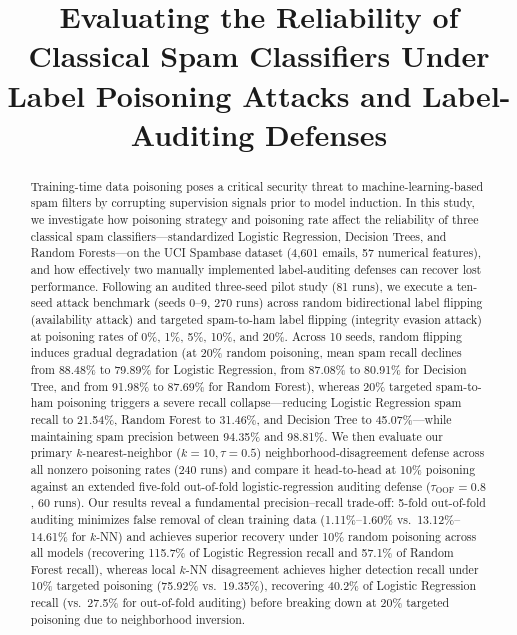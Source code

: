 \documentclass[10pt,conference]{IEEEtran}
\begin{document}
\title{Evaluating the Reliability of Classical Spam Classifiers Under Label Poisoning Attacks and Label-Auditing Defenses}

\author{
}

\maketitle

\begin{abstract}
Training-time data poisoning poses a critical security threat to machine-learning-based spam filters by corrupting supervision signals prior to model induction. In this study, we investigate how poisoning strategy and poisoning rate affect the reliability of three classical spam classifiers---standardized Logistic Regression, Decision Trees, and Random Forests---on the UCI Spambase dataset (4,601 emails, 57 numerical features), and how effectively two manually implemented label-auditing defenses can recover lost performance. Following an audited three-seed pilot study (81 runs), we execute a ten-seed attack benchmark (seeds 0--9, 270 runs) across random bidirectional label flipping (availability attack) and targeted spam-to-ham label flipping (integrity evasion attack) at poisoning rates of 0\%, 1\%, 5\%, 10\%, and 20\%. Across 10 seeds, random flipping induces gradual degradation (at 20\% random poisoning, mean spam recall declines from 88.48\% to 79.89\% for Logistic Regression, from 87.08\% to 80.91\% for Decision Tree, and from 91.98\% to 87.69\% for Random Forest), whereas 20\% targeted spam-to-ham poisoning triggers a severe recall collapse---reducing Logistic Regression spam recall to 21.54\%, Random Forest to 31.46\%, and Decision Tree to 45.07\%---while maintaining spam precision between 94.35\% and 98.81\%. We then evaluate our primary $k$-nearest-neighbor ($k=10, \tau=0.5$) neighborhood-disagreement defense across all nonzero poisoning rates (240 runs) and compare it head-to-head at 10\% poisoning against an extended five-fold out-of-fold logistic-regression auditing defense ($\tau_{\text{OOF}}=0.8$, 60 runs). Our results reveal a fundamental precision--recall trade-off: 5-fold out-of-fold auditing minimizes false removal of clean training data (1.11\%--1.60\% vs.\ 13.12\%--14.61\% for $k$-NN) and achieves superior recovery under 10\% random poisoning across all models (recovering 115.7\% of Logistic Regression recall and 57.1\% of Random Forest recall), whereas local $k$-NN disagreement achieves higher detection recall under 10\% targeted poisoning (75.92\% vs.\ 19.35\%), recovering 40.2\% of Logistic Regression recall (vs.\ 27.5\% for out-of-fold auditing) before breaking down at 20\% targeted poisoning due to neighborhood inversion.
\end{abstract}
\end{document}
